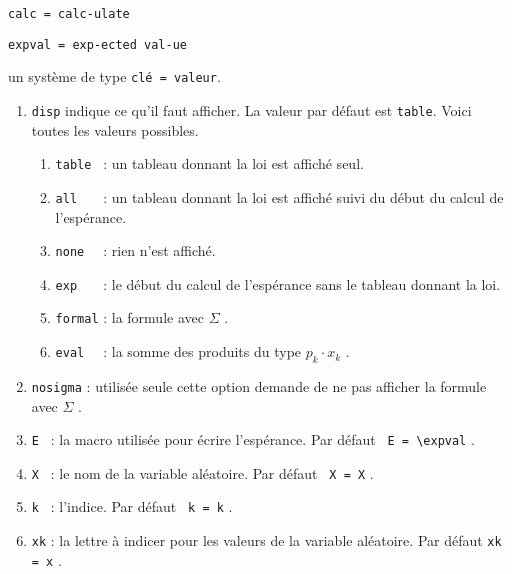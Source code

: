 \documentclass[12pt,a4paper]{article}
\theoremstyle{definition}
\newcommand\extraspace{
    \vspace{0.25em}
}
\newcommand\mwhyprefix[2]{%
    \texttt{#1 = #1-#2}%
}
\newcommand\prefix[1]{%
    \texttt{#1}%
}
\begin{document}
 \hfill \mwhyprefix{calc}{ulate}

                           \hfill \prefix{expval = exp-ected val-ue}

\IDoption{} un système de type \texttt{clé = valeur}.

\begin{enumerate}
    \item \verb#disp# indique ce qu'il faut afficher. La valeur par défaut est \verb#table#. Voici toutes les valeurs possibles.
	\begin{enumerate}
    	\item \verb#table # : un tableau donnant la loi est affiché seul.

    	\item \verb#all   # : un tableau donnant la loi est affiché suivi du début du calcul de l'espérance.

    	\item \verb#none  # : rien n'est affiché.
	
		\extraspace

    	\item \verb#exp   # : le début du calcul de l'espérance sans le tableau donnant la loi.

    	\item \verb#formal# : la formule avec $\Sigma$ .

    	\item \verb#eval  # : la somme des produits du type $p_k \cdot x_k$ .
	\end{enumerate}


    \medskip

    \item \verb#nosigma# : utilisée seule cette option demande de ne pas afficher la formule avec $\Sigma$ .


    \medskip

    \item \verb#E # : la macro utilisée pour écrire l'espérance.
		  \hfill
		  Par défaut \verb# E = \expval# .

    \item \verb#X # : le nom de la variable aléatoire.
		  \hfill
		  Par défaut \verb# X = X# .\verb#      #

    \item \verb#k # : l'indice.
		  \hfill
		  Par défaut \verb# k = k# .\verb#      #

    \item \verb#xk# : la lettre à indicer pour les valeurs de la variable aléatoire.
		  \hfill
		  Par défaut \verb#xk = x# .\verb#      #


\end{enumerate}
\end{document}
